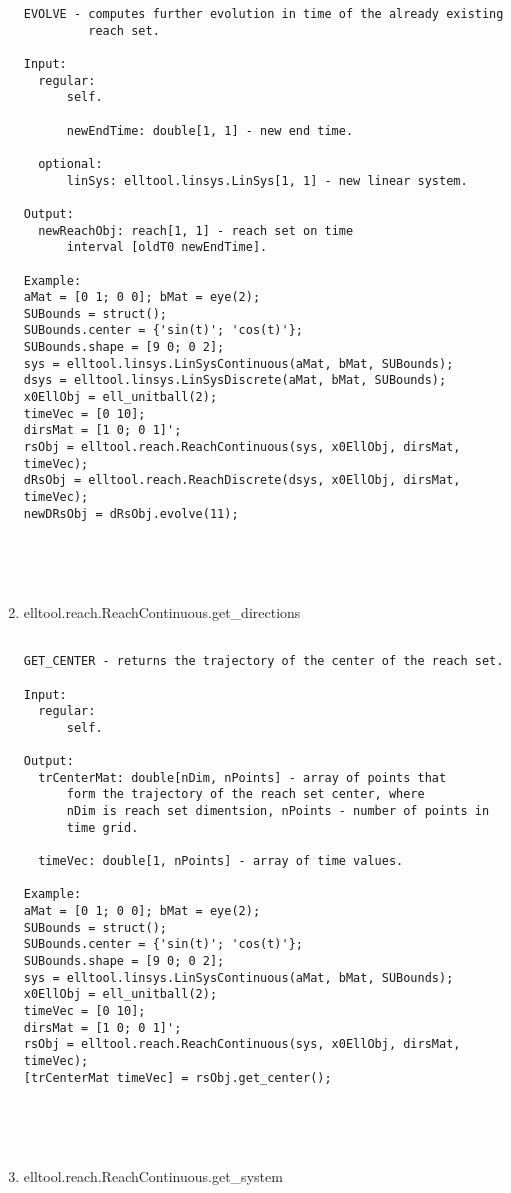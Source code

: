 \begin{enumerate}
\begin{lstlisting}
EVOLVE - computes further evolution in time of the already existing
         reach set.

Input:
  regular:
      self.

      newEndTime: double[1, 1] - new end time.

  optional:
      linSys: elltool.linsys.LinSys[1, 1] - new linear system.

Output:
  newReachObj: reach[1, 1] - reach set on time
      interval [oldT0 newEndTime].

Example:
aMat = [0 1; 0 0]; bMat = eye(2);
SUBounds = struct();
SUBounds.center = {'sin(t)'; 'cos(t)'};
SUBounds.shape = [9 0; 0 2];
sys = elltool.linsys.LinSysContinuous(aMat, bMat, SUBounds);
dsys = elltool.linsys.LinSysDiscrete(aMat, bMat, SUBounds);
x0EllObj = ell_unitball(2);
timeVec = [0 10];
dirsMat = [1 0; 0 1]';
rsObj = elltool.reach.ReachContinuous(sys, x0EllObj, dirsMat, timeVec);
dRsObj = elltool.reach.ReachDiscrete(dsys, x0EllObj, dirsMat, timeVec);
newDRsObj = dRsObj.evolve(11);





\end{lstlisting}
\fontfamily{\familydefault}
\selectfont
\item {elltool.reach.ReachContinuous.get\_directions}
\selectfont
\begin{lstlisting}

GET_CENTER - returns the trajectory of the center of the reach set.

Input:
  regular:
      self.

Output:
  trCenterMat: double[nDim, nPoints] - array of points that
      form the trajectory of the reach set center, where
      nDim is reach set dimentsion, nPoints - number of points in
      time grid.

  timeVec: double[1, nPoints] - array of time values.

Example:
aMat = [0 1; 0 0]; bMat = eye(2);
SUBounds = struct();
SUBounds.center = {'sin(t)'; 'cos(t)'};
SUBounds.shape = [9 0; 0 2];
sys = elltool.linsys.LinSysContinuous(aMat, bMat, SUBounds);
x0EllObj = ell_unitball(2);
timeVec = [0 10];
dirsMat = [1 0; 0 1]';
rsObj = elltool.reach.ReachContinuous(sys, x0EllObj, dirsMat, timeVec);
[trCenterMat timeVec] = rsObj.get_center();





\end{lstlisting}
\fontfamily{\familydefault}
\selectfont
\item {elltool.reach.ReachContinuous.get\_system}
\selectfont
\begin{lstlisting}


\end{lstlisting}
\end{enumerate}
